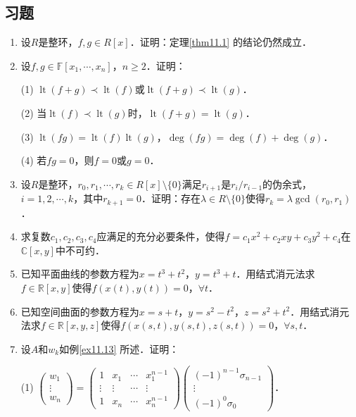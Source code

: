 \documentclass[a4paper,fontset=windows]{ctexbook}
\theoremstyle{definition}
\DeclareMathOperator{\lt}{lt}
\renewcommand{\ge}{\geqslant}
\begin{document}
\subsection*{习题}

\begin{enumerate}
\item 设$R$是整环，$f,g\in R[x]$．证明：定理\ref{thm11.1} 的结论仍然成立．

\item 设$f,g\in\mathbb{F}[x_1,\cdots,x_n]$，$n\ge 2$．证明：

(1) $\lt(f+g)\prec\lt(f)$或$\lt(f+g)\prec\lt(g)$．

(2) 当$\lt(f)\prec\lt(g)$时，$\lt(f+g)=\lt(g)$．

(3) $\lt(fg)=\lt(f)\lt(g)$，$\deg(fg)=\deg(f)+\deg(g)$．

(4) 若$fg=0$，则$f=0$或$g=0$．

\item 设$R$是整环，$r_0,r_1,\cdots,r_k\in R[x]\setminus\{0\}$满足$r_{i+1}$是$r_i/r_{i-1}$的伪余式，$i=1,2,\cdots,k$，其中$r_{k+1}=0$．证明：存在$\lambda\in R\setminus\{0\}$使得$r_k=\lambda\gcd(r_0,r_1)$．

\item 求复数$c_1,c_2,c_3,c_4$应满足的充分必要条件，使得$f=c_1x^2+c_2xy+c_3y^2+c_4$在$\mathbb{C}[x,y]$中不可约．

\item 已知平面曲线的参数方程为$x=t^3+t^2$，$y=t^3+t$．用结式消元法求$f\in\mathbb{R}[x,y]$使得$f(x(t),y(t))=0$，$\forall t$．

\item 已知空间曲面的参数方程为$x=s+t$，$y=s^2-t^2$，$z=s^2+t^2$．用结式消元法求$f\in\mathbb{R}[x,y,z]$使得$f(x(s,t),y(s,t),z(s,t))=0$，$\forall s,t$．

\item 设$A$和$w_k$如例\ref{ex11.13} 所述．证明：

(1) $\begin{pmatrix}w_1 \\ \vdots \\ w_n\end{pmatrix}=\begin{pmatrix}1&x_1&\cdots&x_1^{n-1} \\ \vdots&\vdots&\cdots&\vdots \\ 1&x_n&\cdots&x_n^{n-1}\end{pmatrix}\begin{pmatrix}(-1)^{n-1}\sigma_{n-1} \\ \vdots \\ (-1)^0\sigma_0\end{pmatrix}$．


\end{enumerate}
\end{document}
